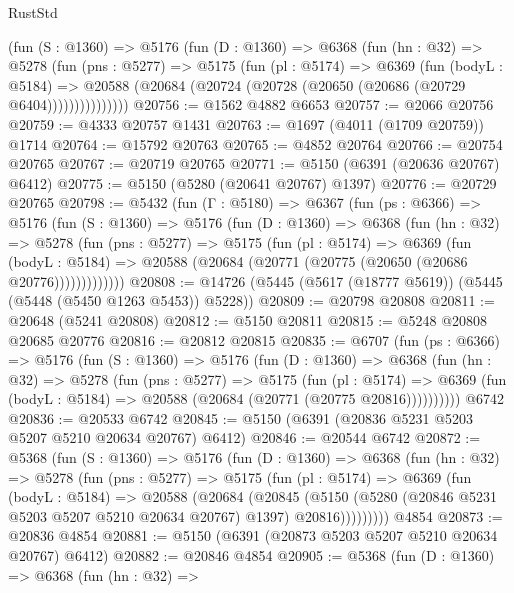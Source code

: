\begin{lexlean}{RustStd}
\begin{coremodule}
          (fun (S : @1360) =>
          @5176
            (fun (D : @1360) =>
            @6368
              (fun (hn : @32) =>
              @5278
                (fun (pns : @5277) =>
                @5175
                  (fun (pl : @5174) =>
                  @6369
                    (fun (bodyL : @5184) =>
                    @20588 (@20684 (@20724 (@20728 (@20650 (@20686 (@20729 @6404)))))))))))))))
@20756 := @1562 @4882 @6653
@20757 := @2066 @20756
@20759 := @4333 @20757 @1431
@20763 := @1697 (@4011 (@1709 @20759)) @1714
@20764 := @15792 @20763
@20765 := @4852 @20764
@20766 := @20754 @20765
@20767 := @20719 @20765
@20771 := @5150 (@6391 (@20636 @20767) @6412)
@20775 := @5150 (@5280 (@20641 @20767) @1397)
@20776 := @20729 @20765
@20798 := @5432
    (fun (Γ : @5180) =>
    @6367
      (fun (ps : @6366) =>
      @5176
        (fun (S : @1360) =>
        @5176
          (fun (D : @1360) =>
          @6368
            (fun (hn : @32) =>
            @5278
              (fun (pns : @5277) =>
              @5175
                (fun (pl : @5174) =>
                @6369
                  (fun (bodyL : @5184) =>
                  @20588 (@20684 (@20771 (@20775 (@20650 (@20686 @20776)))))))))))))
@20808 := @14726 (@5445 (@5617 (@18777 @5619)) (@5445 (@5448 (@5450 @1263 @5453)) @5228))
@20809 := @20798 @20808
@20811 := @20648 (@5241 @20808)
@20812 := @5150 @20811
@20815 := @5248 @20808 @20685 @20776
@20816 := @20812 @20815
@20835 := @6707
    (fun (ps : @6366) =>
    @5176
      (fun (S : @1360) =>
      @5176
        (fun (D : @1360) =>
        @6368
          (fun (hn : @32) =>
          @5278
            (fun (pns : @5277) =>
            @5175
              (fun (pl : @5174) =>
              @6369 (fun (bodyL : @5184) => @20588 (@20684 (@20771 (@20775 @20816))))))))))
    @6742
@20836 := @20533 @6742
@20845 := @5150 (@6391 (@20836 @5231 @5203 @5207 @5210 @20634 @20767) @6412)
@20846 := @20544 @6742
@20872 := @5368
    (fun (S : @1360) =>
    @5176
      (fun (D : @1360) =>
      @6368
        (fun (hn : @32) =>
        @5278
          (fun (pns : @5277) =>
          @5175
            (fun (pl : @5174) =>
            @6369
              (fun (bodyL : @5184) =>
              @20588
                (@20684
                  (@20845
                    (@5150
                      (@5280 (@20846 @5231 @5203 @5207 @5210 @20634 @20767) @1397)
                      @20816)))))))))
    @4854
@20873 := @20836 @4854
@20881 := @5150 (@6391 (@20873 @5203 @5207 @5210 @20634 @20767) @6412)
@20882 := @20846 @4854
@20905 := @5368
    (fun (D : @1360) =>
    @6368
      (fun (hn : @32) =>

\end{coremodule}
\end{lexlean}
